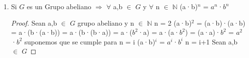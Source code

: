 \documentclass[10pt,a4paper,oneside]{article}
\begin{document}
\begin{enumerate}[1.]
\begin{enumerate}[a)]
\begin{proof}
								\end{proof}
						\end{enumerate}
					\item Si $G$ es un Grupo abeliano $\Rightarrow$ $\forall$ a,b $\in$ $G$ y $\forall$ n $\in$ $\mathbb{N}$ (a·b)$^n$ = $a^n$·$b^n$
					\begin{proof}
						Sean a,b $\in$ $G$ grupo abeliano y n $\in$ $\mathbb{N}$
						\newline
						n = 2
						\newline
						(a·b)$^2$ = (a·b)·(a·b) = a·(b·(a·b)) = a·(b·(b·a)) = a·($b^2$·a) = a·(a·$b^2$) = (a·a)·$b^2$ = $a^2$·$b^2$
						\newline
						\newline
						suponemos que se cumple para n = i
						(a·b)$^i$ = $a^i$·$b^i$
						\newline
						\newline
						n = i+1
						\newline
						Sean a,b $\in$ $G$ 
					\end{proof}
				\end{enumerate}
\end{document}
